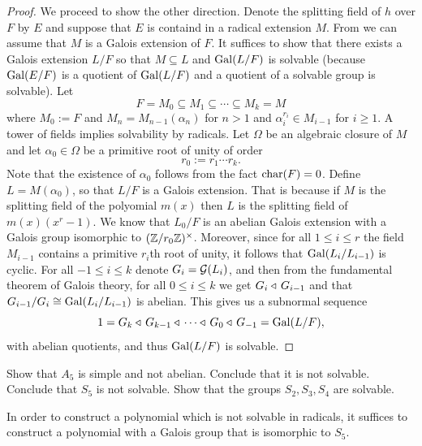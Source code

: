 \documentclass[11pt,a4paper]{article}
\begin{document}
\begin{proof}
  We proceed to show the other direction.
  Denote the splitting field of $h$ over $F$ by $E$
  and suppose that $E$ is containd in a radical extension $M$.
  From 
  we can assume that $M$ is a Galois extension of $F$.
  It suffices to show that there exists a Galois extension $L/F$
  so that $M \subseteq L$ and $\operatorname{Gal}(L/F)$ is solvable
  (because $\operatorname{Gal}(E/F)$ is a quotient of $\operatorname{Gal}(L/F)$ and a quotient of 
  a solvable group is solvable).
  Let
  \[
    F = M_0 \subseteq M_1 \subseteq \cdots \subseteq M_k = M
  \]
  where $M_0 := F$ and $M_{n} = M_{n-1}(\alpha_n)$ for $n > 1$
  and $\alpha_i^{r_i} \in M_{i-1}$ for $i \geq 1$.
  A tower of fields implies solvability by radicals.
  Let $\Omega$ be an algebraic closure of $M$
  and let $\alpha_0 \in \Omega$ be a primitive root of unity of order
  \[
    r_0 := r_1 \cdots r_k.
  \]
  Note that the existence of $\alpha_0$ follows from the fact $\text{char}(F) = 0$.
  Define $L = M(\alpha_0)$, so that $L/F$ is a Galois extension.
  That is because if $M$ is the splitting field of the polyomial $m(x)$
  then $L$ is the splitting field of $m(x)(x^r - 1)$.
  We know that $L_0/F$ is an abelian Galois extension with
  a Galois group isomorphic to $(\mathbb{Z}/r_0\mathbb{Z})^{\times}$.
  Moreover, since for all $1 \le i \le r$
  the field $M_{i-1}$ contains a primitive $r_i$th root of unity,
  it follows that $\operatorname{Gal}(L_i/L_{i-1})$ is cyclic.
  For all $-1 \le i \le k$ denote $G_i = \mathcal G(L_i)$,
  and then from the fundamental theorem of Galois theory,
  for all $0 \le i \le k$ we get $G_i \triangleleft\, G_{i-1}$
  and that $G_{i-1}/G_i \cong \operatorname{Gal}(L_i/L_{i-1})$ is abelian.
  This gives us a subnormal sequence
  \[
    1 = G_k \triangleleft\, G_{k-1} \triangleleft\, \cdots \triangleleft\, G_0 \triangleleft\, G_{-1}
    = \operatorname{Gal}(L/F),
  \]
  with abelian quotients, and thus $\operatorname{Gal}(L/F)$ is solvable.
\end{proof}

\begin{exercise}
  Show that $A_5$ is simple and not abelian.
  Conclude that it is not solvable.
  Conclude that $S_5$ is not solvable.
  Show that the groups $S_2,S_3,S_4$ are solvable.
\end{exercise}

\begin{remark}
  In order to construct a polynomial
  which is not solvable in radicals, it suffices to construct
  a polynomial with a Galois group that is isomorphic to $S_5$.
\end{remark}
\end{document}
